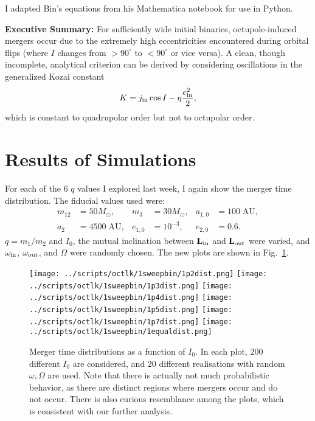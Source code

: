 \documentclass[11pt,
        usenames, %
        dvipsnames %
    ]{article}
\newcommand*{\bm}[1]{\boldsymbol{\mathbf{#1}}}
\begin{document}
\onehalfspacing

\pagestyle{fancy}
\rhead{}
\cfoot{\thepage/\pageref{LastPage}}

I adapted Bin's equations from his Mathematica notebook for use in Python.

\textbf{Executive Summary:} For sufficiently wide initial binaries,
octupole-induced mergers occur due to the extremely high eccentricities
encountered during orbital flips (where $I$ changes from $> 90^\circ$ to
$<90^\circ$ or vice versa). A clean, though incomplete, analytical criterion can
be derived by considering oscillations in the generalized Kozai constant
\begin{equation}
    K = j_{\rm in}\cos I - \eta\frac{e_{\rm in}^2}{2},
        \label{eq:K}
\end{equation}
which is constant to quadrupolar order but not to octupolar order.

\section{Results of Simulations}

For each of the $6$ $q$ values I explored last week, I again show the merger
time distribution. The fiducial values used were:
\begin{align*}
    m_{12} &= 50M_{\odot}, &
    m_3 &= 30 M_{\odot}, &
    a_{1,0} &= 100\;\mathrm{AU}, \\
    a_2 &= 4500\;\mathrm{AU},&
    e_{1, 0} &= 10^{-3}, &
    e_{2, 0} &= 0.6.
\end{align*}
$q = m_1 / m_2$ and $I_0$, the mutual inclination between $\bm{L}_{\rm in}$ and
$\bm{L}_{\rm out}$ were varied, and $\omega_{\rm in}$, $\omega_{\rm out}$, and
$\Omega$ were randomly chosen. The new plots are shown in
Fig.~\ref{fig:mergers}.

\begin{figure}
    \centering
    \texttt{[image: ../scripts/octlk/1sweepbin/1p2dist.png]}
    \texttt{[image: ../scripts/octlk/1sweepbin/1p3dist.png]}
    \texttt{[image: ../scripts/octlk/1sweepbin/1p4dist.png]}
    \texttt{[image: ../scripts/octlk/1sweepbin/1p5dist.png]}
    \texttt{[image: ../scripts/octlk/1sweepbin/1p7dist.png]}
    \texttt{[image: ../scripts/octlk/1sweepbin/1equaldist.png]}
    \caption{Merger time distributions as a function of $I_0$. In each plot,
    $200$ different $I_0$ are considered, and $20$ different realisations with
    random $\omega, \Omega$ are used. Note that there is actually not much
    probabilistic behavior, as there are distinct regions where mergers occur
    and do not occur. There is also curious resemblance among the plots, which
    is consistent with our further analysis.}\label{fig:mergers}
\end{figure}
\end{document}
